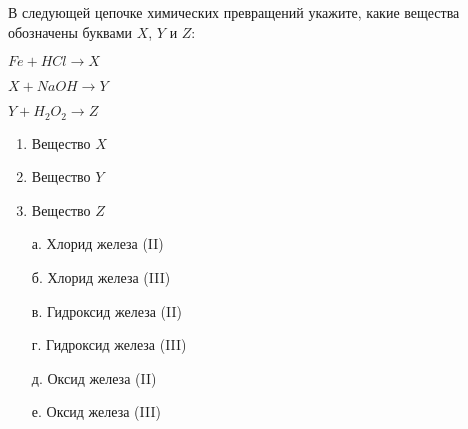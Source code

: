 
В следующей цепочке химических превращений укажите, какие вещества обозначены
буквами $X$, $Y$ и $Z$:

$Fe + HCl \rightarrow X$

$X + NaOH \rightarrow Y$

$Y + H_2O_2 \rightarrow Z$

        \begin{enumerate}
            \item Вещество $X$
            \item Вещество $Y$
            \item Вещество $Z$
        \end{enumerate}

        \begin{enumerate}
            \item[а.] Хлорид железа (II)
            \item[б.] Хлорид железа (III)
            \item[в.] Гидроксид железа (II)
            \item[г.] Гидроксид железа (III)
            \item[д.] Оксид железа (II)
            \item[е.] Оксид железа (III)
        \end{enumerate}

